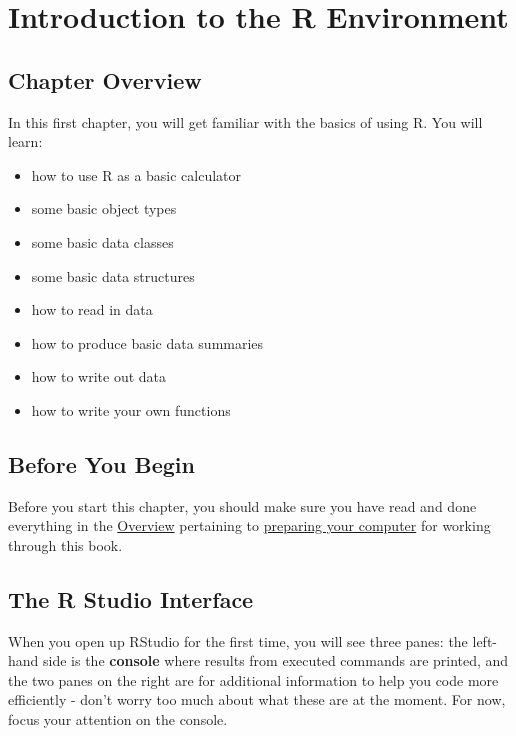 \documentclass[]{book}
\providecommand{\tightlist}{%
  \setlength{\itemsep}{0pt}\setlength{\parskip}{0pt}}
\theoremstyle{definition}
\theoremstyle{definition}
\theoremstyle{definition}
\theoremstyle{remark}
\begin{document}
\chapter{Introduction to the R Environment}\label{ch1}

\section*{Chapter Overview}\label{chapter-overview}

In this first chapter, you will get familiar with the basics of using R.
You will learn:

\begin{itemize}
\tightlist
\item
  how to use R as a basic calculator
\item
  some basic object types
\item
  some basic data classes
\item
  some basic data structures
\item
  how to read in data
\item
  how to produce basic data summaries
\item
  how to write out data
\item
  how to write your own functions
\end{itemize}

\section*{Before You Begin}\label{before-you-begin}

Before you start this chapter, you should make sure you have read and
done everything in the \protect\hyperlink{overview}{Overview} pertaining
to \protect\hyperlink{comp-prep}{preparing your computer} for working
through this book.

\section{The R Studio Interface}\label{the-r-studio-interface}

When you open up RStudio for the first time, you will see three panes:
the left-hand side is the \textbf{console} where results from executed
commands are printed, and the two panes on the right are for additional
information to help you code more efficiently - don't worry too much
about what these are at the moment. For now, focus your attention on the
console.
\end{document}
